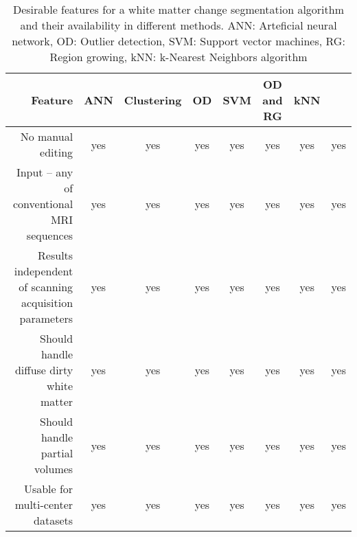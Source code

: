 \begin{table}
\centering
    \begin{tabular}  {  r | c c c c c c c }
        Feature & ANN \cite{Zijdenbos_2002} & Clustering \cite{LesionTOADS_2010} & OD \cite{OutlierLocalIntensity_2011} & SVM \cite{CascadeOrig} & OD and RG \cite{LesionSegmentationToolbox_2012} & kNN \cite{kNN-TTPs_2013} & \cite{Rotation-invariant_2015} \\
    \hline %
        No manual editing                                      & yes & yes & yes & yes & yes & yes & yes \\ 
        Input – any of conventional MRI sequences              & yes & yes & yes & yes & yes & yes & yes \\ 
        Results independent of scanning acquisition parameters & yes & yes & yes & yes & yes & yes & yes \\ 
        Should handle diffuse dirty white matter               & yes & yes & yes & yes & yes & yes & yes \\ 
        Should handle partial volumes                          & yes & yes & yes & yes & yes & yes & yes \\ 
        Usable for multi-center datasets                       & yes & yes & yes & yes & yes & yes & yes \\ 
    \hline
    \end{tabular} 
    \caption{Desirable features for a white matter change segmentation algorithm and their availability in different methods. ANN: Arteficial neural network, OD: Outlier detection, SVM: Support vector machines, RG: Region growing, kNN: k-Nearest Neighbors algorithm} 
    \label{Table:Other_Methods}
\end{table}
  
  
  
  
  